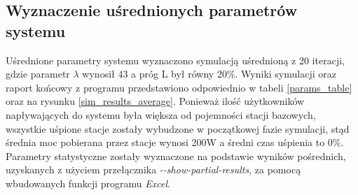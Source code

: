 \subsection{Wyznaczenie uśrednionych parametrów systemu} \label{get_params_section}
Uśrednione parametry systemu wyznaczono symulacją uśrednioną z 20 iteracji, gdzie parametr $\lambda$ wynosił 43 a próg L był równy 20\%. Wyniki symulacji oraz raport końcowy z programu przedstawiono odpowiednio w tabeli \ref{params_table} oraz na rysunku \ref{sim_results_average}. Ponieważ ilość użytkowników napływających do systemu była większa od pojemności stacji bazowych, wszystkie uśpione stacje zostały wybudzone w początkowej fazie symulacji, stąd średnia moc pobierana przez stacje wynosi 200W a średni czas uśpienia to 0\%. Parametry statystyczne zostały wyznaczone na podstawie wyników pośrednich, uzyskanych z użyciem przełącznika \emph{-{}-show-partial-results}, za pomocą wbudowanych funkcji programu \emph{Excel}.
\newline\newline
